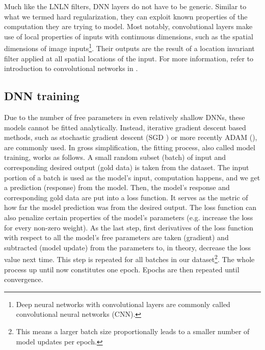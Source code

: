 
Much like the LNLN filters, DNN layers do not have to be generic. Similar to what we termed hard regularization, they can exploit known properties of the computation they are trying to model. Most notably, convolutional layers make use of local properties of inputs with continuous dimensions, such as the spatial dimensions of image inputs\footnote{Deep neural networks with convolutional layers are commonly called convolutional neural networks (CNN).}. Their outputs are the result of a location invariant filter applied at all spatial locations of the input. For more information, refer to introduction to convolutional networks in \cite{thesis_hojdar}.

\subsection{DNN training}

Due to the number of free parameters in even relatively shallow DNNs, these models cannot be fitted analytically. Instead, iterative gradient descent based methods, such as stochastic gradient descent (SGD \cite{kiefer1952}) or more recently ADAM (\cite{kingma2014adam}), are commonly used. In gross simplification, the fitting process, also called model training, works as follows. A small random subset (batch) of input and corresponding desired output (gold data) is taken from the dataset. The input portion of a batch is used as the model’s input, computation happens, and we get a prediction (response) from the model. Then, the model’s response and corresponding gold data are put into a loss function. It serves as the metric of how far the model prediction was from the desired output. The loss function can also penalize certain properties of the model’s parameters (e.g. increase the loss for every non-zero weight). As the last step, first derivatives of the loss function with respect to all the model’s free parameters are taken (gradient) and subtracted (model update) from the parameters to, in theory, decrease the loss value next time. This step is repeated for all batches in our dataset\footnote{This means a larger batch size proportionally leads to a smaller number of model updates per epoch.}. The whole process up until now constitutes one epoch. Epochs are then repeated until convergence.

